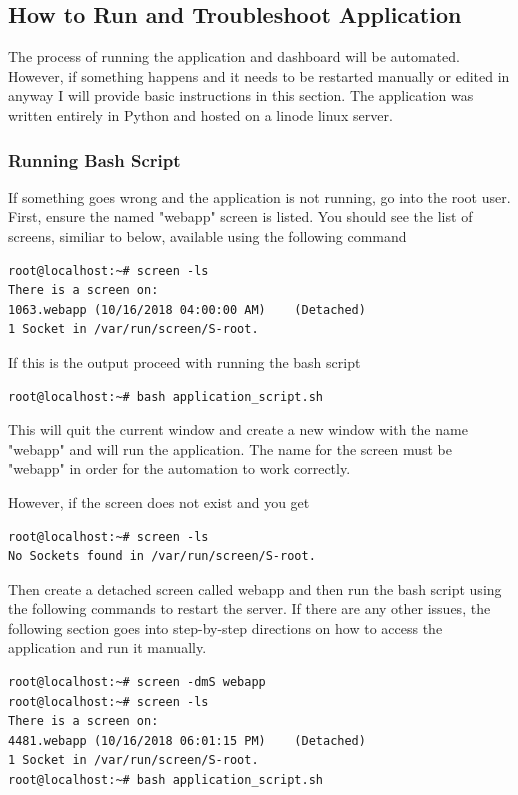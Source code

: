 \documentclass[titlepage]{article}
\begin{document}
\subsection{How to Run and Troubleshoot Application}
The process of running the application and dashboard will be automated. However, if something happens and it needs to be restarted manually or edited in anyway I will provide basic instructions in this section. The application was written entirely in Python and hosted on a linode linux server.

\subsubsection{Running Bash Script}
If something goes wrong and the application is not running, go into the root user. First, ensure the named "webapp" screen is listed. You should see the list of screens, similiar to below, available using the following command
\begin{verbatim}
root@localhost:~# screen -ls
There is a screen on:
1063.webapp	(10/16/2018 04:00:00 AM)	(Detached)
1 Socket in /var/run/screen/S-root.
\end{verbatim}
If this is the output proceed with running the bash script
\begin{verbatim}
root@localhost:~# bash application_script.sh
\end{verbatim}
This will quit the current window and create a new window with the name "webapp" and will run the application. The name for the screen must be "webapp" in order for the automation to work correctly.

However, if the screen does not exist and you get 
\begin{verbatim}
root@localhost:~# screen -ls
No Sockets found in /var/run/screen/S-root.
\end{verbatim}
Then create a detached screen called webapp and then run the bash script using the following commands to restart the server. If there are any other issues, the following section goes into step-by-step directions on how to access the application and run it manually. 
\begin{verbatim}
root@localhost:~# screen -dmS webapp 
root@localhost:~# screen -ls
There is a screen on:
4481.webapp	(10/16/2018 06:01:15 PM)	(Detached)
1 Socket in /var/run/screen/S-root.
root@localhost:~# bash application_script.sh 
\end{verbatim}
\end{document}
